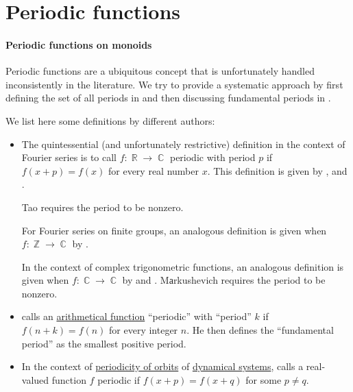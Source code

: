 \section{Periodic functions}\label{sec:periodic_functions}

\paragraph{Periodic functions on monoids}

\begin{remark}\label{rem:periodic_functions_and_periods}
  Periodic functions are a ubiquitous concept that is unfortunately handled inconsistently in the literature. We try to provide a systematic approach by first defining the set of all periods in  and then discussing fundamental periods in .

  We list here some definitions by different authors:
  \begin{itemize}
    \item The quintessential (and unfortunately restrictive) definition in the context of Fourier series is to call \( f: \BbbR \to \BbbC \) periodic with period \( p \) if \( f(x + p) = f(x) \) for every real number \( x \). This definition is given by
    ,
     and
    .

    Tao requires the period to be nonzero.

    For Fourier series on finite groups, an analogous definition is given when \( f: \BbbZ \to \BbbC \) by .

    In the context of complex trigonometric functions, an analogous definition is given when \( f: \BbbC \to \BbbC \) by  and . Mаrkushevich requires the period to be nonzero.

    \item {} calls an \hyperref[def:arithmetic_function]{arithmetical function} \enquote{periodic} with \enquote{period} \( k \) if \( f(n + k) = f(n) \) for every integer \( n \). He then defines the \enquote{fundamental period} as the smallest positive period.

    \item In the context of \hyperref[def:dynamical_system_periodicity]{periodicity of orbits} of \hyperref[def:dynamical_system]{dynamical systems},  calls a  real-valued function \( f \) periodic if \( f(x + p) = f(x + q) \) for some \( p \neq q \).


\end{itemize}
\end{remark}
